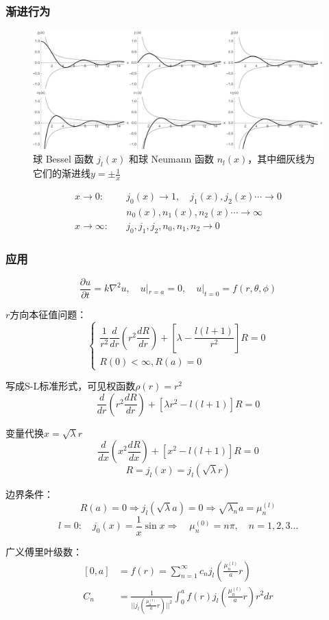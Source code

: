 \subsubsection{渐进行为}

\begin{figure}[H]
    \centering 
    \includegraphics[width=15cm]{figures/SphereBessel.png} %
    \caption{球 Bessel 函数 $j_l(x)$ 和球 Neumann 函数 $n_l(x)$，其中细灰线为它们的渐进线$y=\pm\frac{1}{x}$} %
    \label{SphereBessel}
\end{figure}

$$\begin{aligned}
    x\to0:\quad &j_{0}(x)\to1,\quad j_{1}(x),j_{2}(x)\cdots\to0\\
    &n_{0}(x),n_{1}(x),n_{2}(x)\cdots\to\infty\\
    x\to\infty:\quad &j_{0},j_{1},j_{2},n_{0},n_{1},n_{2}\to0
\end{aligned}$$

\subsubsection{应用}
\begin{ex}[球内热传导问题]

    $$\frac{\partial u}{\partial t}=k\nabla^2u,\quad u|_{r=a}=0,\quad u|_{t=0}=f(r,\theta,\phi)$$

    $r$方向本征值问题：
$$\begin{cases}
\dfrac{1}{r^{2}}\dfrac{d}{dr}(r^{2}\dfrac{dR}{dr})+[\lambda-\dfrac{l(l+1)}{r^{2}}]R=0\\
R(0)<\infty,R(a)=0
\end{cases}$$

写成S-L标准形式，可见权函数$\rho(r)=r^2$
$$\frac{d}{dr}(r^{2}\frac{dR}{dr})+[\lambda r^{2}-l(l+1)]R=0$$

变量代换$x=\sqrt{\lambda}r$
$$\frac{d}{dx}(x^{2}\frac{dR}{dx})+[x^{2}-l(l+1)]R=0$$
$$R=j_{l}(x)=j_{l}(\sqrt{\lambda}r)$$

边界条件：
$$R(a)=0\Rightarrow j_{l}(\sqrt{\lambda}a)=0\Rightarrow\sqrt{\lambda_{n}}a=\mu_{n}^{(l)}$$
$$l=0:\quad j_{0}(x)=\frac{1}{x}\sin x\Rightarrow\quad\mu_{n}^{(0)}=n\pi,\quad n=1,2,3\ldots $$

广义傅里叶级数：
$$\begin{aligned}
    [0,a]&=f(r)=\sum_{n=1}^{\infty}c_{n}j_{l}(\frac{\mu_{n}^{(l)}}{a}r)\\
    C_{n}&=\frac{1}{||j_{l}(\frac{\mu_{n}^{(l)}}{a}r)||^{2}}\int_{0}^{a}f(r)j_{l}(\frac{\mu_{n}^{(l)}}{a}r)r^{2}dr
\end{aligned}$$
\end{ex}
